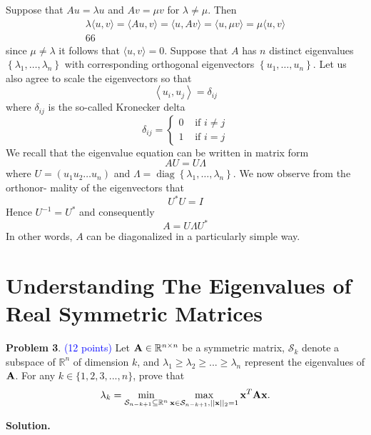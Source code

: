 \documentclass[english,onecolumn]{IEEEtran}
\newcommand{\Rbb}{\mathbb{R}}
\newcommand{\bigS}{\mathcal{S}}
\newcommand{\bA}{{\bf A}}
\newcommand{\bx}{{\bf x}}
\begin{document}
\begin{enumerate}
    Suppose that $A u=\lambda u$ and $A v=\mu v$ for $\lambda \neq \mu .$ Then
    $$
    \begin{array}{c}
    	\lambda\langle u, v\rangle=\langle A u, v\rangle=\langle u, A v\rangle=\langle u, \mu v\rangle=\mu\langle u, v\rangle \\
    	66
    \end{array}
    $$
    since $\mu \neq \lambda$ it follows that $\langle u, v\rangle=0$. Suppose that $A$ has $n$ distinct eigenvalues $\left\{\lambda_{1}, \ldots, \lambda_{n}\right\}$ with corresponding orthogonal
    eigenvectors $\left\{u_{1}, \ldots, u_{n}\right\} .$ Let us also agree to scale the eigenvectors so that
    $$
    \left\langle u_{i}, u_{j}\right\rangle=\delta_{i j}
    $$
    where $\delta_{i j}$ is the so-called Kronecker delta
    $$
    \delta_{i j}=\left\{\begin{array}{ll}
    	0 & \text { if } i \neq j \\
    	1 & \text { if } i=j
    \end{array}\right.
    $$
    We recall that the eigenvalue equation can be written in matrix form
    $$
    A U=U \Lambda
    $$
    where $U=\left(u_{1} u_{2} \ldots u_{n}\right)$ and $\Lambda=\operatorname{diag}\left\{\lambda_{1}, \ldots, \lambda_{n}\right\} .$ We now observe from the orthonor-
    mality of the eigenvectors that
    $$
    U^{*} U=I
    $$
    Hence $U^{-1}=U^{*}$ and consequently
    $$
    A=U \Lambda U^{*}
    $$
    In other words, $A$ can be diagonalized in a particularly simple way.
\end{enumerate}

\clearpage
\section{Understanding The Eigenvalues of Real Symmetric Matrices}
\noindent\textbf{Problem 3}. \textcolor{blue}{(12 points)}
\noindent 
Let $\bA\in \Rbb^{n\times n}$ be a symmetric matrix, $\bigS_k$ denote a subspace of $\Rbb^n$ of dimension $k$, and $\lambda_1\geq \lambda_2\geq...\geq \lambda_n$ represent the eigenvalues of $\bA$. 
For any $k\in\{1,2,3,...,n\}$, prove that \[\lambda_k=\min\limits_{\bigS_{n-k+1}\subseteq \Rbb^n}\max\limits_{\bx\in\bigS_{n-k+1},||\bx||_2=1} \bx^T\bA\bx.\]

\noindent
\textbf{Solution.}
\end{document}
